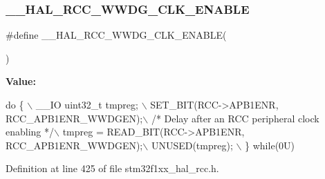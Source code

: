 \subsubsection{\texorpdfstring{\+\_\+\+\_\+\+H\+A\+L\+\_\+\+R\+C\+C\+\_\+\+W\+W\+D\+G\+\_\+\+C\+L\+K\+\_\+\+E\+N\+A\+B\+LE}{\_\_HAL\_RCC\_WWDG\_CLK\_ENABLE}}
{\footnotesize\ttfamily \#define \+\_\+\+\_\+\+H\+A\+L\+\_\+\+R\+C\+C\+\_\+\+W\+W\+D\+G\+\_\+\+C\+L\+K\+\_\+\+E\+N\+A\+B\+LE(\begin{DoxyParamCaption}{ }\end{DoxyParamCaption})}

{\bfseries Value\+:}
\begin{DoxyCode}
\textcolor{keywordflow}{do} \{ \(\backslash\)
                                        \_\_IO uint32\_t tmpreg; \(\backslash\)
                                        SET\_BIT(RCC->APB1ENR, RCC\_APB1ENR\_WWDGEN);\(\backslash\)
                                        \textcolor{comment}{/* Delay after an RCC peripheral clock enabling */}\(\backslash\)
                                        tmpreg = READ\_BIT(RCC->APB1ENR, RCC\_APB1ENR\_WWDGEN);\(\backslash\)
                                        UNUSED(tmpreg); \(\backslash\)
                                      \} \textcolor{keywordflow}{while}(0U)
\end{DoxyCode}


Definition at line 425 of file stm32f1xx\+\_\+hal\+\_\+rcc.\+h.

